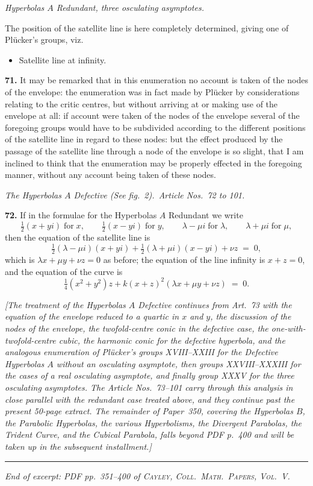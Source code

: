 \documentclass[11pt,a4paper]{article}
\begin{document}
\noindent\emph{Hyperbolas $A$ Redundant, three osculating asymptotes.}
\smallskip

The position of the satellite line is here completely determined, giving one of Pl\"ucker's groups, viz.\
\begin{itemize}\itemsep0pt
\item[XVI.] Satellite line at infinity.
\end{itemize}

\medskip

\textbf{71.} It may be remarked that in this enumeration no account is taken of the nodes of the envelope: the enumeration was in fact made by Pl\"ucker by considerations relating to the critic centres, but without arriving at or making use of the envelope at all: if account were taken of the nodes of the envelope several of the foregoing groups would have to be subdivided according to the different positions of the satellite line in regard to these nodes: but the effect produced by the passage of the satellite line through a node of the envelope is so slight, that I am inclined to think that the enumeration may be properly effected in the foregoing manner, without any account being taken of these nodes.

\medskip

\noindent\textit{The Hyperbolas $A$ Defective (See fig.\ 2).\ Article Nos.\ 72 to 101.}

\medskip

\textbf{72.} If in the formulae for the Hyperbolas $A$ Redundant we write
\[
\tfrac{1}{2}(x + y i) \;\text{for}\;x,\qquad \tfrac{1}{2}(x - y i) \;\text{for}\;y,\qquad \lambda - \mu i \;\text{for}\;\lambda,\qquad \lambda + \mu i \;\text{for}\;\mu,
\]
then the equation of the satellite line is
\[
\tfrac{1}{2}(\lambda - \mu i)(x + y i) + \tfrac{1}{2}(\lambda + \mu i)(x - y i) + \nu z \;=\; 0,
\]
which is $\lambda x + \mu y + \nu z = 0$ as before; the equation of the line infinity is $x + z = 0$, and the equation of the curve is
\[
\tfrac{1}{4}(x^{2}+y^{2})z + k(x+z)^{2}(\lambda x + \mu y + \nu z) \;=\; 0.
\]

\medskip

\noindent\textit{[The treatment of the Hyperbolas $A$ Defective continues from Art.~73 with the equation of the envelope reduced to a quartic in $x$ and $y$, the discussion of the nodes of the envelope, the twofold-centre conic in the defective case, the one-with-twofold-centre cubic, the harmonic conic for the defective hyperbola, and the analogous enumeration of Pl\"ucker's groups XVIII--XXIII for the Defective Hyperbolas $A$ without an osculating asymptote, then groups XXVIII--XXXIII for the cases of a real osculating asymptote, and finally group XXXV for the three osculating asymptotes. The Article Nos.~73--101 carry through this analysis in close parallel with the redundant case treated above, and they continue past the present 50-page extract. The remainder of Paper~350, covering the Hyperbolas $B$, the Parabolic Hyperbolas, the various Hyperbolisms, the Divergent Parabolas, the Trident Curve, and the Cubical Parabola, falls beyond PDF p.~400 and will be taken up in the subsequent installment.]}

\bigskip
\noindent\rule{\textwidth}{0.4pt}
\bigskip

\begin{center}
\textit{End of excerpt: PDF pp.~351--400 of \textsc{Cayley, Coll.\ Math.\ Papers, Vol.~V}.}
\end{center}
\end{document}
